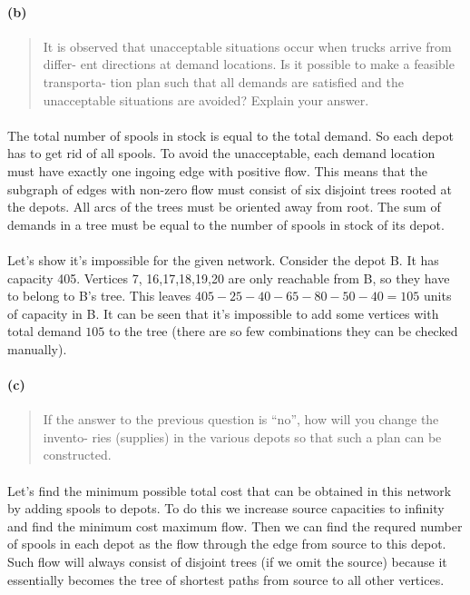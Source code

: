 \paragraph{(b)}
\begin{quote}
It is observed that unacceptable situations occur when trucks arrive from differ- ent directions at demand locations. Is it possible to make a feasible transporta- tion plan such that all demands are satisfied and the unacceptable situations are avoided? Explain your answer.
\end{quote}

\paragraph{}
The total number of spools in stock is equal to the total demand. So each depot has to get rid of all spools. To avoid the unacceptable, each demand location must have exactly one ingoing edge with positive flow. This means that the subgraph of edges with non-zero flow must consist of six disjoint trees rooted at the depots. All arcs of the trees must be oriented away from root. The sum of demands in a tree must be equal to the number of spools in stock of its depot.

\paragraph{}
Let's show it's impossible for the given network. Consider the depot B. It has capacity 405. Vertices 7, 16,17,18,19,20 are only reachable from B, so they have to belong to B's tree. This leaves $405-25-40-65-80-50-40=105$ units of capacity in B. It can be seen that it's impossible to add some vertices with total demand $105$ to the tree (there are so few combinations they can be checked manually).

\paragraph{(c)}
\begin{quote}
If the answer to the previous question is “no”, how will you change the invento- ries (supplies) in the various depots so that such a plan can be constructed.
\end{quote}

\paragraph{}
Let's find the minimum possible total cost that can be obtained in this network by adding spools to depots. To do this we increase source capacities to infinity and find the minimum cost maximum flow. Then we can find the requred number of spools in each depot as the flow through the edge from source to this depot. Such flow will always consist of disjoint trees (if we omit the source) because it essentially becomes the tree of shortest paths from source to all other vertices.

